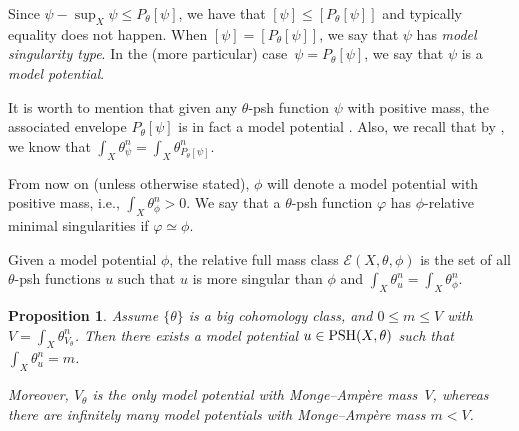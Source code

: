 \documentclass[11pt]{article}
\numberwithin{equation}{section}
\numberwithin{equation}{section}
\newtheorem{Proposition}[Theorem]{Proposition}
{ \theoremstyle{definition}
\newtheorem{Definition}[Theorem]{Definition}
\newtheorem{Note}[Theorem]{Note}
\newtheorem{Example}[Theorem]{Example}
\newtheorem{Remark}[Theorem]{Remark}
\newtheorem{Question}[Theorem]{Question}
}
\theoremstyle{plain}
\newcommand \PSH {{\rm PSH}}
\begin{document}
Since $\psi - \sup_X \psi \leq P_\theta[\psi]$, we have that $[\psi] \leq [P_\theta[\psi]]$ and typically equality does not happen. When $[\psi] = [P_\theta[\psi]]$, we say that $\psi$ has \emph{model singularity type}. In the (more particular) case~${\psi = P_\theta[\psi]}$, we say that $\psi$ is a \emph{model potential}.

It is worth to mention that given any $\theta$-psh function $\psi$ with positive mass, the associated envelope $P_\theta[\psi]$ is in fact a model potential \cite[Theorem~3.14]{DDL6}.
Also, we recall that by \cite[Remark~3.4]{DDL6}, we know that $\int_X \theta_\psi^n = \int_X \theta_{P_\theta[\psi]}^n$.

From now on (unless otherwise stated), $\phi$ will denote a model potential with positive mass, i.e., $\int_X \theta_\phi^n>0$. We say that a $\theta$-psh function $\varphi$ has $\phi$-relative minimal singularities if $\varphi \simeq \phi$.

\begin{Definition}
Given a model potential $\phi$, the relative full mass class $\mathcal{E}(X,\theta,\phi)$ is the set of all $\theta$-psh functions $u$ such that $u$ is more singular than $\phi$ and $\int_X \theta_u^n=\int_X \theta_{\phi}^n$.
\end{Definition}

\begin{Proposition}\label{mass}
Assume $\{ \theta \}$ is a big cohomology class, and $0 \leq m \leq V$ with $V = \int_X \theta_{V_\theta}^n$. Then there exists a model potential $ u \in \PSH(X,\theta)$ such that $\int_X \theta_u^n = m$.

Moreover, $V_\theta$ is the only model potential with Monge--Amp\`ere mass~$V$, whereas there are infinitely many model potentials with Monge--Amp\`ere mass $m < V$.
\end{Proposition}
\end{document}
